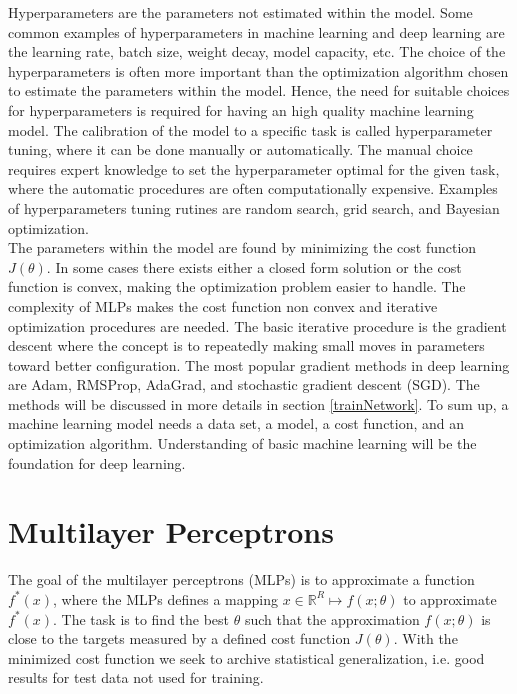 Hyperparameters are the parameters not estimated within the model. Some common examples of hyperparameters in machine learning and deep learning are the learning rate, batch size, weight decay, model capacity, etc. The choice of the hyperparameters is often more important than the optimization algorithm chosen to estimate the parameters within the model. Hence, the need for suitable choices for hyperparameters is required for having an high quality machine learning model. The calibration of the model to a specific task is called hyperparameter tuning, where it can be done manually or automatically. The manual choice requires expert knowledge to set the hyperparameter optimal for the given task, where the automatic procedures are often computationally expensive. Examples of hyperparameters tuning rutines are random search, grid search, and Bayesian optimization.\\

The parameters within the model are found by minimizing the cost function $J(\theta)$. In some cases there exists either a closed form solution or the cost function is convex, making the optimization problem easier to handle. The complexity of MLPs makes the cost function non convex and iterative optimization procedures are needed. The basic iterative procedure is the gradient descent where the concept is to repeatedly making small moves in parameters toward better configuration. The most popular gradient methods in deep learning are Adam, RMSProp, AdaGrad, and stochastic gradient descent (SGD). The methods will be discussed in more details in section \ref{trainNetwork}. To sum up, a machine learning model needs a data set, a model, a cost function, and an optimization algorithm. Understanding of basic machine learning will be the foundation for deep learning.



\section{Multilayer Perceptrons}\label{multilayerPerceptron}
The goal of the multilayer perceptrons (MLPs) is to approximate a function $f^*(x)$, where the MLPs defines a mapping $x\in \mathbb{R}^R \mapsto f(x;\theta)$ to approximate $f^*(x)$. The task is to find the best $\theta$ such that the approximation $f(x;\theta)$ is close to the targets measured by a defined cost function $J(\theta)$. With the minimized cost function we seek to archive statistical generalization, i.e. good results for test data not used for training. \\

